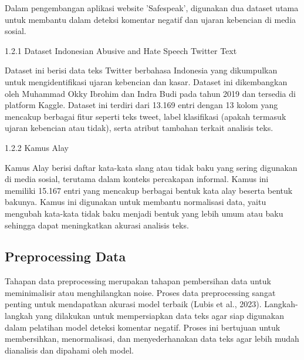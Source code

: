 \documentclass[journal,article,submit,pdftex,moreauthors]{Definitions/mdpi}
\begin{document}
\begin{adjustwidth}{2em}{0pt} \hspace{0.3cm} Dalam pengembangan aplikasi website 'Safespeak', digunakan dua dataset utama untuk membantu dalam deteksi komentar negatif dan ujaran kebencian di media sosial. \end{adjustwidth}

\item \hspace{1cm} {1.2.1 Dataset Indonesian Abusive and Hate Speech Twitter Text}


\begin{adjustwidth}{2em}{0pt} \hspace{1cm} Dataset ini berisi data teks Twitter berbahasa Indonesia yang dikumpulkan untuk mengidentifikasi ujaran kebencian dan kasar. Dataset ini dikembangkan oleh Muhammad Okky Ibrohim dan Indra Budi pada tahun 2019 dan tersedia di platform Kaggle. Dataset ini terdiri dari 13.169 entri dengan 13 kolom yang mencakup berbagai fitur seperti teks tweet, label klasifikasi (apakah termasuk ujaran kebencian atau tidak), serta atribut tambahan terkait analisis teks.\end{adjustwidth}

\item \hspace{1cm} 1.2.2 Kamus Alay


\begin{adjustwidth}{2em}{0pt} \hspace{1cm} Kamus Alay berisi daftar kata-kata slang atau tidak baku yang sering digunakan di media sosial, terutama dalam konteks percakapan informal. Kamus ini memiliki 15.167 entri yang mencakup berbagai bentuk kata alay beserta bentuk bakunya. Kamus ini digunakan untuk membantu normalisasi data, yaitu mengubah kata-kata tidak baku menjadi bentuk yang lebih umum atau baku sehingga dapat meningkatkan akurasi analisis teks.\end{adjustwidth}

\subsection{Preprocessing Data}

\begin{adjustwidth}{2em}{0pt} \hspace{0.3cm} Tahapan data preprocessing merupakan tahapan pembersihan data untuk meminimalisir atau menghilangkan noise. Proses data preprocessing sangat penting untuk mendapatkan akurasi model terbaik (Lubis et al., 2023). Langkah-langkah yang dilakukan untuk mempersiapkan data teks agar siap digunakan dalam pelatihan model deteksi komentar negatif. Proses ini bertujuan untuk membersihkan, menormalisasi, dan menyederhanakan data teks agar lebih mudah dianalisis dan dipahami oleh model. \end{adjustwidth}
\end{document}

